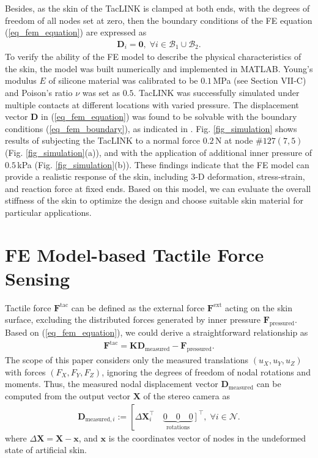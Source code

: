 \documentclass[10pt,letterpaper,journal,final,twoside,twocolumn,nofonttune]{IEEEtran}
\begin{document}
Besides, as the skin of the TacLINK is clamped at both ends, with the degrees of freedom of all nodes set at zero, then the boundary conditions of the FE equation (\ref{eq_fem_equation}) are expressed as
\begin{equation}
\label{eq_fem_boundary}
\begin{aligned}
\mathbf{D}_{i} = \bm{0},\; \forall i\in \mathcal{B}_1\cup \mathcal{B}_2.
\end{aligned}
\end{equation}
To verify the ability of the FE model to describe the physical characteristics of the skin, the model was built numerically and implemented in MATLAB. Young's modulus $E$ of silicone material was calibrated to be $0.1$\,MPa (see Section VII-C) and Poison's ratio $\nu$ was set as $0.5$. TacLINK was successfully simulated under multiple contacts at different locations with varied pressure. The displacement vector $\mathbf{D}$ in  (\ref{eq_fem_equation}) was found to be solvable with the boundary conditions (\ref{eq_fem_boundary}), as indicated in \cite{Young}. Fig. \ref{fig_simulation} shows results of subjecting the TacLINK to a normal force $0.2$\,N at node \#$127(7,5)$ (Fig. \ref{fig_simulation}(a)), and with the application of additional inner pressure of $0.5$\,kPa (Fig. \ref{fig_simulation}(b)). These findings indicate that the FE model can provide a realistic response of the skin, including 3-D deformation, stress-strain, and reaction force at fixed ends. Based on this model, we can evaluate the overall stiffness of the skin to optimize the design and choose suitable skin material for particular applications.
\section{FE Model-based Tactile Force Sensing}
Tactile force $\mathbf{F}^{\text{tac}}$ can be defined as the external force $\mathbf{F}^{\text{ext}}$ acting on the skin surface, excluding the distributed forces generated by inner pressure $\mathbf{F}_{\text{pressured}}$. Based on (\ref{eq_fem_equation}), we could derive a straightforward relationship as
\begin{equation}
\label{eq_fem_force}
\begin{aligned}
\mathbf{F}^{\text{tac}}=\mathbf{K}\mathbf{D}_{\text{measured}}-\mathbf{F}_{\text{pressured}}.
\end{aligned}
\end{equation}
The scope of this paper considers only the measured translations $(u_{X},u_{Y},u_{Z})$ with forces $(F_{X},F_{Y},F_{Z})$, ignoring the degrees of freedom of nodal rotations and moments. Thus, the measured nodal displacement vector $\mathbf{D}_{\text{measured}}$ can be computed from the output vector $\mathbf{X}$ of the stereo camera as
\begin{align}
\label{eq_fem_dis}
\mathbf{D}_{\text{measured},i}:= \left [\right.\Delta{\mathbf{X}}_i^\top\quad\underbrace{0\quad0\quad0}_{\text{rotations}}
\left .\right ]^\top, \;\forall i \in \mathcal{N}.
\end{align}
where $\Delta{\mathbf{X}} = {\mathbf{X}}-\mathbf{x}$, and $\mathbf{x}$ is the coordinates vector of nodes in the undeformed state of artificial skin.  
\end{document}
